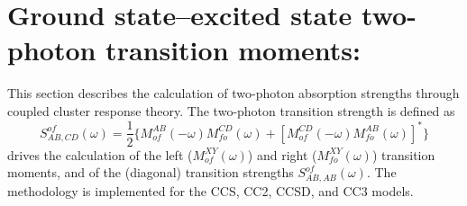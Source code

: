 
\section{Ground state--excited state two-photon transition moments:
} \label{sec:cctpa}

This section describes the calculation of 
two-photon absorption strengths 
through coupled cluster response theory.
The two-photon transition strength is defined as
\[
S^{of}_{AB,CD}(\omega) = \frac{1}{2} \{ M^{AB}_{of}(-\omega) M^{CD}_{fo}(\omega)
                         +[M^{CD}_{of}(-\omega) M^{AB}_{fo}(\omega)]^\ast\}
\]
 drives the calculation of the left ($M^{XY}_{of}(\omega)$)
and right ($M^{XY}_{fo}(\omega)$) transition moments, and of the 
(diagonal) transition strengths $S^{of}_{AB,AB}(\omega)$.
The methodology is implemented for the CCS, CC2, CCSD, and CC3 models.

\begin{center}
\end{center}

